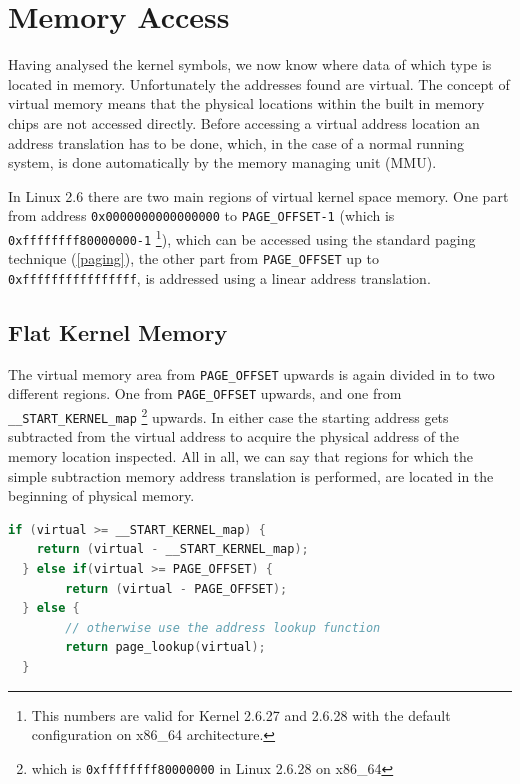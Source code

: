\section{Memory Access}
Having analysed the kernel symbols, we now know where data of which type is located in memory. 
Unfortunately the addresses found are virtual. The concept of virtual memory means that the physical 
locations within the built in memory chips are not accessed directly. Before accessing a virtual address 
location an address translation has to be done, which, in the case of a normal running system, 
is done automatically by the memory managing unit (MMU). 

In Linux 2.6 there are two main regions of virtual kernel space memory. One part from address 
\texttt{0x0000000000000000} to \texttt{PAGE\_OFFSET-1} (which is \texttt{0xffffffff80000000-1} 
\footnote{This numbers are valid for Kernel 2.6.27 and 2.6.28 with the default configuration 
on x86\_64 architecture.}), which can be accessed using the standard paging technique (\ref{paging}), 
the other part from \texttt{PAGE\_OFFSET} up to \texttt{0xffffffffffffffff}, is addressed using a 
linear address translation.

\subsection{Flat Kernel Memory}
\label{flat_kernel_memory}
The virtual memory area from \texttt{PAGE\_OFFSET} upwards is again divided in to two different regions. 
One from \texttt{PAGE\_OFFSET} upwards, and one from \texttt{\_\_START\_KERNEL\_map} 
\footnote{which is \texttt{0xffffffff80000000} in Linux 2.6.28 on x86\_64} upwards. 
In either case the starting address gets subtracted from the virtual address to acquire the 
physical address of the memory location inspected. All in all, we can say that regions for which 
the simple subtraction memory address translation is performed, are located in the beginning of physical memory.

\begin{lstlisting}[language=C,frame=single,caption=Accessing flat kernel memory and determine whether paging is required.,label=lst:flat_memory_access]
  if (virtual >= __START_KERNEL_map) {
  	return (virtual - __START_KERNEL_map);
  } else if(virtual >= PAGE_OFFSET) {
        return (virtual - PAGE_OFFSET);
  } else {
        // otherwise use the address lookup function
        return page_lookup(virtual);
  }
\end{lstlisting}

